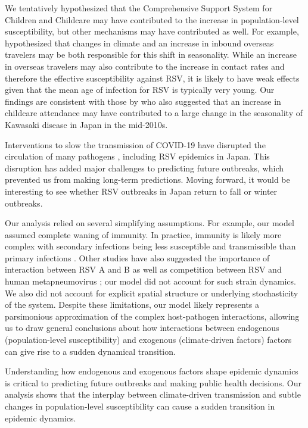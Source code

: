 \documentclass[12pt]{article}
\begin{document}
We tentatively hypothesized that the Comprehensive Support System for Children and Childcare may have contributed to the increase in population-level susceptibility, but other mechanisms may have contributed as well.
For example, \cite{wagatsuma2021shifts} hypothesized that changes in climate and an increase in inbound overseas travelers may be both responsible for this shift in seasonality.
While an increase in overseas travelers may also contribute to the increase in contact rates and therefore the effective susceptibility against RSV, it is likely to have weak effects given that the mean age of infection for RSV is typically very young.
Our findings are consistent with those by \cite{dehaan2024age} who also suggested that an increase in childcare attendance may have contributed to a large change in the seasonality of Kawasaki disease in Japan in the mid-2010s.

Interventions to slow the transmission of COVID-19 have disrupted the circulation of many pathogens \citep{baker2020impact,eden2022off,chen2024covid,park2024predicting}, including RSV epidemics in Japan.
This disruption has added major challenges to predicting future outbreaks, which prevented us from making long-term predictions.
Moving forward, it would be interesting to see whether RSV outbreaks in Japan return to fall or winter outbreaks.

Our analysis relied on several simplifying assumptions.
For example, our model assumed complete waning of immunity.
In practice, immunity is likely more complex with secondary infections being less susceptible and transmissible than primary infections \citep{pitzer2015environmental}.
Other studies have also suggested the importance of interaction between RSV A and B \citep{white2005transmission,holmdahl2024differential} as well as competition between RSV and human metapneumovirus \citep{bhattacharyya2015cross}; 
our model did not account for such strain dynamics.
We also did not account for explicit spatial structure or underlying stochasticity of the system.
Despite these limitations, our model likely represents a parsimonious approximation of the complex host-pathogen interactions, allowing us to draw general conclusions about how interactions between endogenous (population-level susceptibility) and exogenous (climate-driven factors) factors can give rise to a sudden dynamical transition.

Understanding how endogenous and exogenous factors shape epidemic dynamics is critical to predicting future outbreaks and making public health decisions.
Our analysis shows that the interplay between climate-driven transmission and subtle changes in population-level susceptibility can cause a sudden transition in epidemic dynamics.
\end{document}
